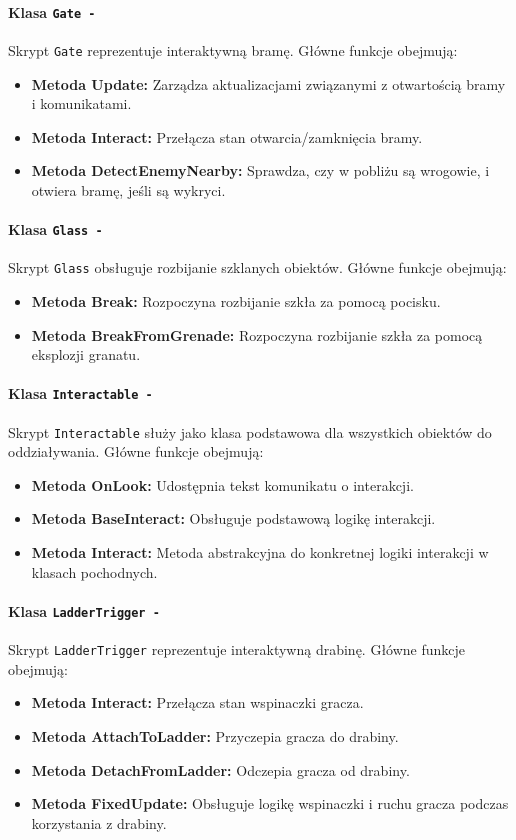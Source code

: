 \paragraph{Klasa \texttt{Gate -}}
Skrypt \texttt{Gate} reprezentuje interaktywną bramę. Główne funkcje obejmują:
\begin{itemize}
  \item \textbf{Metoda Update:} Zarządza aktualizacjami związanymi z otwartością bramy i komunikatami.
  \item \textbf{Metoda Interact:} Przełącza stan otwarcia/zamknięcia bramy.
  \item \textbf{Metoda DetectEnemyNearby:} Sprawdza, czy w pobliżu są wrogowie, i otwiera bramę, jeśli są wykryci.
\end{itemize}

\paragraph{Klasa \texttt{Glass -}}
Skrypt \texttt{Glass} obsługuje rozbijanie szklanych obiektów. Główne funkcje obejmują:
\begin{itemize}
  \item \textbf{Metoda Break:} Rozpoczyna rozbijanie szkła za pomocą pocisku.
  \item \textbf{Metoda BreakFromGrenade:} Rozpoczyna rozbijanie szkła za pomocą eksplozji granatu.
\end{itemize}

\paragraph{Klasa \texttt{Interactable -}}
Skrypt \texttt{Interactable} służy jako klasa podstawowa dla wszystkich obiektów do oddziaływania. Główne funkcje obejmują:
\begin{itemize}
  \item \textbf{Metoda OnLook:} Udostępnia tekst komunikatu o interakcji.
  \item \textbf{Metoda BaseInteract:} Obsługuje podstawową logikę interakcji.
  \item \textbf{Metoda Interact:} Metoda abstrakcyjna do konkretnej logiki interakcji w klasach pochodnych.
\end{itemize}

\paragraph{Klasa \texttt{LadderTrigger -}}
Skrypt \texttt{LadderTrigger} reprezentuje interaktywną drabinę. Główne funkcje obejmują:
\begin{itemize}
  \item \textbf{Metoda Interact:} Przełącza stan wspinaczki gracza.
  \item \textbf{Metoda AttachToLadder:} Przyczepia gracza do drabiny.
  \item \textbf{Metoda DetachFromLadder:} Odczepia gracza od drabiny.
  \item \textbf{Metoda FixedUpdate:} Obsługuje logikę wspinaczki i ruchu gracza podczas korzystania z drabiny.
\end{itemize}

